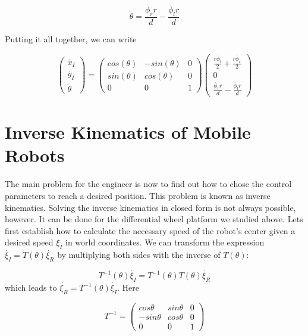 \begin{equation}
\dot{\theta}=\frac{\dot{\phi_r} r}{d}-\frac{\dot{\phi_l} r}{d}
\end{equation}

Putting it all together, we can write

\begin{equation}
\left(\begin{array}{c} \dot{x_I}\\\dot{y_I}\\\dot{\theta}\end{array}\right)=\left(\begin{array}{ccc}
cos(\theta) & -sin(\theta) & 0 \\
sin(\theta) & cos(\theta) & 0 \\
0 & 0 & 1\end{array}\right)\left(\begin{array}{c}\frac{r\dot{\phi_l}}{2}+\frac{r\dot{\phi_r}}{2}\\0\\\frac{\dot{\phi_r} r}{d}-\frac{\dot{\phi_l} r}{d}\end{array}\right)
\end{equation}

\section{Inverse Kinematics of Mobile Robots}\label{sec:ivkmobile}
The main problem for the engineer is now to find out how to chose the control parameters to reach a desired position. This problem is known as inverse kinematics. Solving the inverse kinematics in closed form is not always possible, however. It can be done for the differential wheel platform we studied above. Lets first establish how to calculate the necessary speed of the robot's center given a desired speed $ \dot{\xi_I}$ in world coordinates. We can transform the expression $ \dot{\xi_I}=T(\theta)\dot{\xi_R}$ by multiplying both sides with the inverse of $ T(\theta)$:

\begin{equation}
T^{-1}(\theta)\dot{\xi_I}=T^{-1}(\theta)T(\theta)\dot{\xi_R}
\end{equation}
which leads to $ \dot{\xi_R}=T^{-1}(\theta)\dot{\xi_I}$. Here

\begin{equation}
T^{-1}=\left(\begin{array}{ccc}cos \theta & sin \theta & 0 \\ -sin \theta & cos \theta & 0 \\ 0 & 0 & 1\end{array}\right)
\end{equation}

